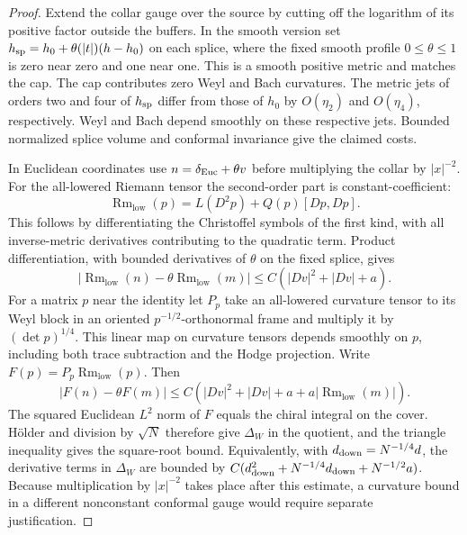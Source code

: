\documentclass[11pt]{article}
\numberwithin{equation}{section}
\theoremstyle{definition}
\theoremstyle{remark}
\newcommand{\Rm}{\operatorname{Rm}}
\begin{document}
\begin{proof}
Extend the collar gauge over the source by cutting off the logarithm
of its positive factor outside the buffers. In the smooth version
set \(h_{\rm sp}=h_0+\theta(|t|)(h-h_0)\) on each splice,
where the fixed smooth profile \(0\le\theta\le1\) is zero near
zero and one near one. This is a smooth positive metric and
matches the cap. The cap contributes zero Weyl and Bach
curvatures. The metric jets of orders two and four of
\(h_{\rm sp}\) differ from those of \(h_0\) by \(O(\eta_2)\)
and \(O(\eta_4)\), respectively. Weyl and Bach depend smoothly on
these respective jets. Bounded normalized splice volume and
conformal invariance give the claimed costs.

In Euclidean coordinates use \(n=\delta_{\rm Euc}+\theta v\)
before multiplying the collar by \(|x|^{-2}\). For the all-lowered
Riemann tensor the second-order part is constant-coefficient:
\[
 \Rm_{\mathrm{low}}(p)=L(D^2p)+Q(p)[Dp,Dp].
\]
This follows by differentiating the Christoffel symbols of the
first kind, with all inverse-metric derivatives contributing to
the quadratic term. Product differentiation, with bounded
derivatives of \(\theta\) on the fixed splice, gives
\[
 |\Rm_{\mathrm{low}}(n)-\theta\Rm_{\mathrm{low}}(m)|
 \le C(|Dv|^2+|Dv|+a).
\]
For a matrix \(p\) near the identity let \(P_p\) take an
all-lowered curvature tensor to its Weyl block in an oriented
\(p^{-1/2}\)-orthonormal frame and multiply it by
\((\det p)^{1/4}\). This linear map on curvature tensors
depends smoothly on \(p\), including both trace subtraction and
the Hodge projection. Write \(F(p)=P_p\Rm_{\mathrm{low}}(p)\).
Then
\[
 |F(n)-\theta F(m)|\le
 C(|Dv|^2+|Dv|+a+a|\Rm_{\mathrm{low}}(m)|).
\]
The squared Euclidean \(L^2\) norm of \(F\) equals the chiral
integral on the cover. Hölder and division by \(\sqrt N\) therefore
give \(\Delta_W\) in the quotient, and the triangle inequality gives
the square-root bound. Equivalently, with
\(d_{\rm down}=N^{-1/4}d\), the derivative terms in \(\Delta_W\)
are bounded by \(C(d_{\rm down}^2+N^{-1/4}d_{\rm down}+N^{-1/2}a)\).
Because multiplication by \(|x|^{-2}\) takes place after this
estimate, a curvature bound in a different nonconstant conformal
gauge would require separate justification.


\end{proof}
\end{document}
